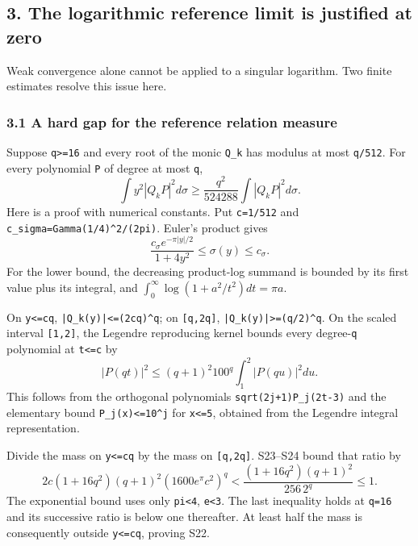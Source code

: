 \subsection{3. The logarithmic reference limit is justified at zero}\label{the-logarithmic-reference-limit-is-justified-at-zero}

Weak convergence alone cannot be applied to a singular logarithm. Two finite estimates resolve this issue here.

\subsubsection{3.1 A hard gap for the reference relation measure}\label{a-hard-gap-for-the-reference-relation-measure}

Suppose \texttt{q\textgreater{}=16} and every root of the monic \texttt{Q\_k} has modulus at most \texttt{q/512}. For every polynomial \texttt{P} of degree at most \texttt{q}, \[
 \boxed{\int y^2|Q_kP|^2d\sigma
 \ge\frac{q^2}{524288}\int|Q_kP|^2d\sigma.}                        \tag{S22}
\] Here is a proof with numerical constants. Put \texttt{c=1/512} and \nolinkurl{c_sigma=Gamma(1/4)^2/(2pi)}. Euler's product gives \[
 \frac{c_\sigma e^{-\pi|y|/2}}{1+4y^2}\le\sigma(y)\le c_\sigma.   \tag{S23}
\] For the lower bound, the decreasing product-log summand is bounded by its first value plus its integral, and \(\int_0^\infty\log(1+a^2/t^2)dt=\pi a\).

On \texttt{\textbar{}y\textbar{}\textless{}=cq}, \nolinkurl{|Q_k(y)|<=(2cq)^q}; on \texttt{{[}q,2q{]}}, \nolinkurl{|Q_k(y)|>=(q/2)^q}. On the scaled interval \texttt{{[}1,2{]}}, the Legendre reproducing kernel bounds every degree-\texttt{q} polynomial at \texttt{\textbar{}t\textbar{}\textless{}=c} by \[
 |P(qt)|^2\le(q+1)^2 100^q\int_1^2|P(qu)|^2du.                   \tag{S24}
\] This follows from the orthogonal polynomials \nolinkurl{sqrt(2j+1)P_j(2t-3)} and the elementary bound \texttt{\textbar{}P\_j(x)\textbar{}\textless{}=10\^{}j} for \texttt{\textbar{}x\textbar{}\textless{}=5}, obtained from the Legendre integral representation.

Divide the mass on \texttt{\textbar{}y\textbar{}\textless{}=cq} by the mass on \texttt{{[}q,2q{]}}. S23--S24 bound that ratio by \[
 2c(1+16q^2)(q+1)^2(1600e^\pi c^2)^q
 <\frac{(1+16q^2)(q+1)^2}{256\,2^q}\le1.                         \tag{S25}
\] The exponential bound uses only \texttt{pi\textless{}4}, \texttt{e\textless{}3}. The last inequality holds at \texttt{q=16} and its successive ratio is below one thereafter. At least half the mass is consequently outside \texttt{\textbar{}y\textbar{}\textless{}=cq}, proving S22.

